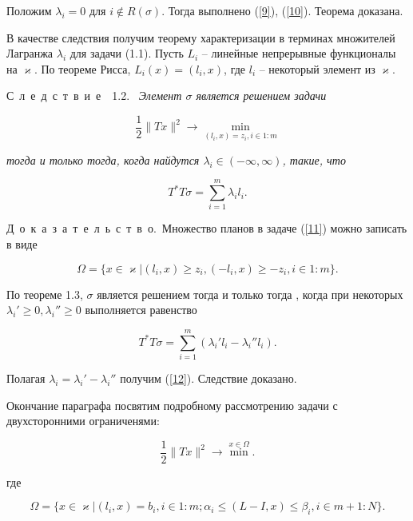 \documentclass{book}
\newcommand{\proof}{Д~о~к~а~з~а~т~е~л~ь~с~т~в~о.\ }
\newcommand{\cons}[1]{С~л~е~д~с~т~в~и~е~~#1.\ }
\begin{document}
\noindent Положим $\lambda_i=0$ для $i\not\in R(\sigma)$. Тогда выполнено (\ref{9}), (\ref{10}). Теорема доказана.
\par В качестве следствия получим теорему характеризации в терминах множителей Лагранжа $\lambda_i$ для задачи (1.1). Пусть $L_i$ -- линейные непрерывные функционалы на $\varkappa$. По теореме Рисса, $L_i(x)=(l_i, x)$, где $l_i$ -- некоторый элемент из $\varkappa$.
\par\cons{1.2} \textit{Элемент $\sigma$ является решением задачи}

\begin{equation}
\frac{1}{2}\|Tx\|^2\rightarrow\min_{(l_i, x)=z_i, i\in1:m}
\label{11}
\end{equation}

\noindent\textit{тогда и только тогда, когда найдутся $\lambda_i\in(-\infty, \infty)$, такие, что}

\begin{equation}
T^*T\sigma=\sum_{i=1}^m\lambda_il_i.
\label{12}
\end{equation}

\par\proof Множество планов в задаче (\ref{11}) можно записать в виде

\begin{equation*}
\Omega=\{x\in\varkappa|(l_i, x)\geq z_i, (-l_i, x)\geq-z_i, i\in1:m\}.
\end{equation*}

\noindent По теореме 1.3, $\sigma$ является решением тогда и только тогда , когда при некоторых $\lambda_i'\geq0, \lambda_i''\geq0$ выполняется равенство

\begin{equation*}
T^*T\sigma=\sum_{i=1}^m(\lambda_i'l_i-\lambda_i''l_i).
\end{equation*}

\noindent Полагая  $\lambda_i=\lambda_i'-\lambda_i''$ получим (\ref{12}). Следствие доказано.
\par Окончание параграфа посвятим подробному рассмотрению задачи с двухсторонними ограниченями:

\begin{equation}
\frac{1}{2}\|Tx\|^2\rightarrow\min^{x\in\Omega}.
\label{13}
\end{equation}

\noindent где

\begin{equation}
\Omega=\{x\in\varkappa|(l_i, x)=b_i, i\in1:m; \alpha_i\leq(L-I, x)\leq\beta_i, i\in m+1:N\}.
\label{14}
\end{equation}
\end{document}
